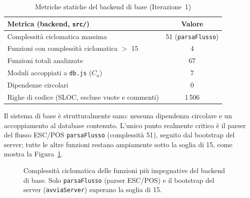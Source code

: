 \begin{table}[H]
\centering
\caption{Metriche statiche del backend di base (Iterazione~1)}
\label{tab:analisi-base}
\begin{tabular}{lc}
\toprule
\textbf{Metrica} (backend, \texttt{src/}) & \textbf{Valore} \\
\midrule
Complessità ciclomatica massima        & 51 (\texttt{parsaFlusso}) \\
Funzioni con complessità ciclomatica ${}>{}$ 15 & 4 \\
Funzioni totali analizzate             & 67 \\
Moduli accoppiati a \texttt{db.js} ($C_a$) & 7 \\
Dipendenze circolari                   & 0 \\
Righe di codice (SLOC, escluse vuote e commenti) & 1\,506 \\
\bottomrule
\end{tabular}
\end{table}

Il sistema di base è strutturalmente sano: nessuna dipendenza circolare e un
accoppiamento al database contenuto. L'unico punto realmente critico è il parser
del flusso ESC/POS \texttt{parsaFlusso} (complessità 51), seguito dal bootstrap del
server; tutte le altre funzioni restano ampiamente sotto la soglia di 15, come
mostra la Figura~\ref{fig:cc-base}.

\begin{figure}[H]
    \centering
    \caption{Complessità ciclomatica delle funzioni più impegnative del backend di
    base. Solo \texttt{parsaFlusso} (parser ESC/POS) e il bootstrap del server
    (\texttt{avviaServer}) superano la soglia di 15.}
    \label{fig:cc-base}
\end{figure}

